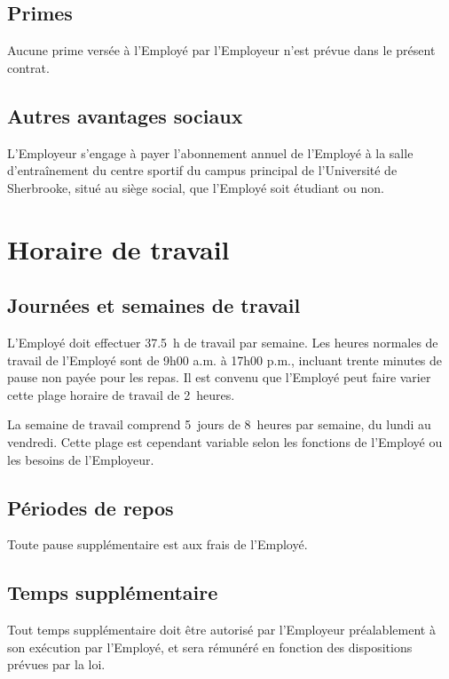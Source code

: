 \documentclass{article}
\begin{document}
    	\subsection{Primes}
    	Aucune prime versée à l'Employé par l'Employeur n'est prévue dans le présent contrat.
    	
    	\subsection{Autres avantages sociaux}
    	L'Employeur s'engage à payer l'abonnement annuel de l'Employé à la salle d'entraînement du centre sportif du campus principal de l'Université de Sherbrooke, situé au siège social, que l'Employé soit étudiant ou non.
    	       	
    
    \section{Horaire de travail}
    	\subsection{Journées et semaines de travail}
    	L'Employé doit effectuer \SI{37,5}{h} de travail par semaine. Les heures normales de travail de l'Employé sont de 9h00 a.m. à 17h00 p.m., incluant trente minutes de pause non payée pour les repas. Il est convenu que l'Employé peut faire varier cette plage horaire de travail de 2~heures.
    	
    	La semaine de travail comprend 5~jours de 8~heures par semaine, du lundi au vendredi. Cette plage est cependant variable selon les fonctions de l'Employé ou les besoins de l'Employeur.
    	
    	\subsection{Périodes de repos}
    	Toute pause supplémentaire est aux frais de l'Employé.
    	
    	\subsection{Temps supplémentaire}
    	Tout temps supplémentaire doit être autorisé par l'Employeur préalablement à son exécution par l'Employé, et sera rémunéré en fonction des dispositions prévues par la loi.  	
    	
\end{document}
